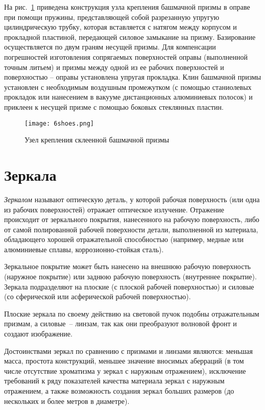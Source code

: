На рис.~\ref{pic:6shoes} приведена конструкция узла крепления башмачной призмы в оправе при помощи пружины, представляющей собой разрезанную упругую цилиндрическую трубку, которая вставляется с натягом между корпусом и прокладной пластиной, передающей силовое замыкание на призму. Базирование осуществляется по двум граням несущей призмы. Для компенсации погрешностей изготовления сопрягаемых поверхностей оправы (выполненной точным литьем) и призмы между одной из ее рабочих поверхностей и поверхностью -- оправы установлена упругая прокладка. Клин башмачной призмы установлен с необходимым воздушным промежутком (с помощью станиолевых прокладок или нанесением в вакууме дистанционных алюминиевых полосок) и приклеен к несущей призме с помощью боковых стеклянных пластин.

\begin{figure}[h!]
	\caption{ Узел крепления склеенной башмачной призмы }
	\texttt{[image: 6shoes.png]}
	\label{pic:6shoes}
\end{figure}

\section{Зеркала}
\textit{Зеркалом} называют оптическую деталь, у которой рабочая поверхность (или одна из рабочих поверхностей) отражает оптическое излучение. Отражение происходит от зеркального покрытия, нанесенного на рабочую поверхность, либо от самой полированной рабочей поверхности детали, выполненной из материала, обладающего хорошей отражательной способностью (например, медные или алюминиевые сплавы, коррозионно-стойкая сталь).

Зеркальное покрытие может быть нанесено на внешнюю рабочую поверхность (наружное покрытие) или заднюю рабочую поверхность (внутреннее покрытие).
Зеркала подразделяют на плоские (с плоской рабочей поверхностью) и силовые (со сферической или асферической рабочей поверхностью).

Плоские зеркала по своему действию на световой пучок подобны отражательным призмам, а силовые~-- линзам, так как они преобразуют волновой фронт и создают изображение.

Достоинствами зеркал по сравнению с призмами и линзами являются: меньшая масса, простота конструкций, меньшее значение вносимых аберраций (в том числе отсутствие хроматизма у зеркал с наружным отражением), исключение требований к ряду показателей качества материала зеркал с наружным отражением, а также возможность создания зеркал больших размеров (до нескольких и более метров в диаметре). 

